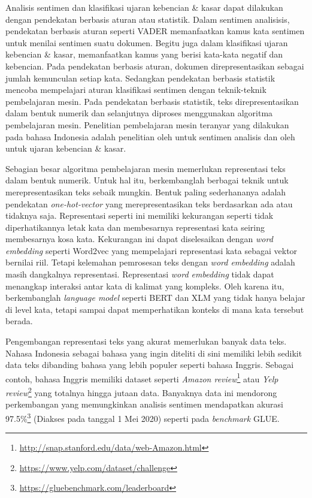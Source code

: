 Analisis sentimen dan klasifikasi ujaran kebencian \& kasar dapat dilakukan dengan pendekatan berbasis aturan atau statistik. Dalam sentimen analisisis, pendekatan berbasis aturan seperti VADER \parencite{VADER} memanfaatkan kamus kata sentimen untuk menilai sentimen suatu dokumen. Begitu juga dalam klasifikasi ujaran kebencian \& kasar, \parencite{lexicon_hatespeech_2015} memanfaatkan kamus yang berisi kata-kata negatif dan kebencian. Pada pendekatan berbasis aturan, dokumen direpresentasikan sebagai jumlah kemunculan setiap kata. Sedangkan pendekatan berbasis statistik mencoba mempelajari aturan klasifikasi sentimen dengan teknik-teknik pembelajaran mesin. Pada pendekatan berbasis statistik, teks direpresentasikan dalam bentuk numerik dan selanjutnya diproses menggunakan algoritma pembelajaran mesin. Penelitian pembelajaran mesin teranyar yang dilakukan pada bahasa Indonesia adalah penelitian oleh \parencite{CrisdayantiPurwarianti2019} untuk sentimen analisis dan oleh \parencite{Ibrohim_Budi_2019} untuk ujaran kebencian \& kasar.

Sebagian besar algoritma pembelajaran mesin memerlukan representasi teks dalam bentuk numerik. Untuk hal itu, berkembanglah berbagai teknik untuk merepresentasikan teks sebaik mungkin. Bentuk paling sederhananya adalah pendekatan \textit{one-hot-vector} yang merepresentasikan teks berdasarkan ada atau tidaknya saja. Representasi seperti ini memiliki kekurangan seperti tidak diperhatikannya letak kata dan membesarnya representasi kata seiring membesarnya kosa kata. Kekurangan ini dapat diselesaikan dengan \textit{word embedding} seperti Word2vec \parencite{MikolovWord2vec} yang mempelajari representasi kata sebagai vektor bernilai riil. Tetapi kelemahan pemrosesan teks dengan \textit{word embedding} adalah masih dangkalnya representasi. Representasi \textit{word embedding} tidak dapat menangkap interaksi antar kata di kalimat yang kompleks. Oleh karena itu, berkembanglah \textit{language model} seperti BERT \parencite{Devlin_Chang_Lee_Toutanova_2019} dan XLM \parencite{LampleConneau2019} yang tidak hanya belajar di level kata, tetapi sampai dapat memperhatikan konteks di mana kata tersebut berada. 

Pengembangan representasi teks yang akurat memerlukan banyak data teks. Nahasa Indonesia sebagai bahasa yang ingin diteliti di sini memiliki lebih sedikit data teks dibanding bahasa yang lebih populer seperti bahasa Inggris. Sebagai contoh, bahasa Inggris memiliki dataset seperti \textit{Amazon review}\footnote{\url{http://snap.stanford.edu/data/web-Amazon.html}} atau \textit{Yelp review}\footnote{\url{https://www.yelp.com/dataset/challenge}} yang totalnya hingga jutaan data. Banyaknya data ini mendorong perkembangan yang memungkinkan analisis sentimen mendapatkan akurasi 97.5\%\footnote{\url{https://gluebenchmark.com/leaderboard}} (Diakses pada tanggal 1 Mei 2020) seperti pada \textit{benchmark} GLUE\parencite{GLUE2019}.

